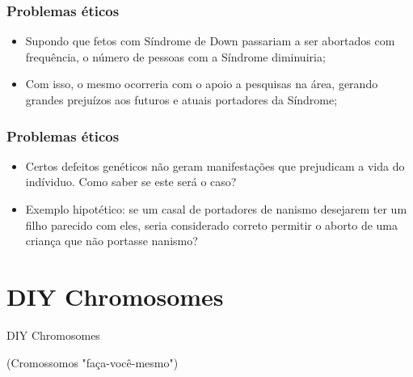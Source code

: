 \documentclass{beamer}
\begin{document}
\begin{frame}
\frametitle{Problemas éticos}
\begin{itemize}
\item Supondo que fetos com Síndrome de Down passariam a ser abortados com frequência, o número de pessoas com a Síndrome diminuiria; 
\item Com isso, o mesmo ocorreria com o apoio a pesquisas na área, gerando grandes prejuízos aos futuros e atuais portadores da Síndrome;
\end{itemize}
\end{frame}

\begin{frame}
\frametitle{Problemas éticos}
\begin{itemize}
\item Certos defeitos genéticos não geram manifestações que prejudicam a vida do indíviduo. Como saber se este será o caso?
\item Exemplo hipotético: se um casal de portadores de nanismo desejarem ter um filho parecido com eles, seria considerado correto permitir o aborto de uma criança que não portasse nanismo?
\end{itemize}
\end{frame}


\section{DIY Chromosomes}


\begin{frame}
\huge{\centerline{DIY Chromosomes}}
\normalsize{\centerline{(Cromossomos "faça-você-mesmo")}}
\end{frame}



\end{document}
